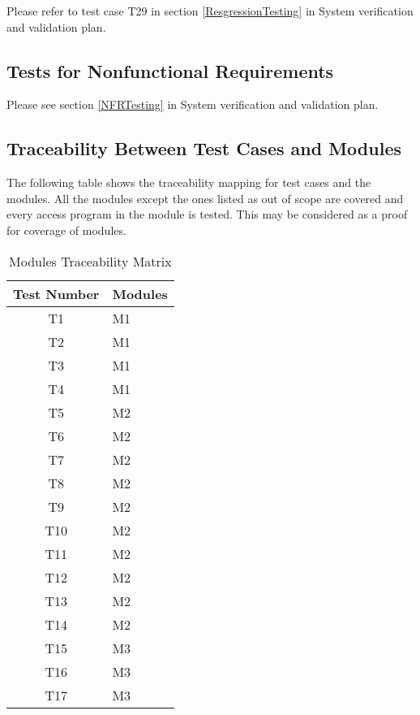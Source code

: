 \documentclass[12pt, titlepage]{article}
\begin{document}
\begin{enumerate}
Please refer to test case T29 in section \ref{ResgressionTesting} in System 
verification and validation plan.





\subsection{Tests for Nonfunctional Requirements}

Please see section \ref{NFRTesting} in System verification and validation plan.

\subsection{Traceability Between Test Cases and Modules}


The following table shows the traceability mapping for test cases and the 
modules. All the modules except the ones listed as out of scope are covered and 
every access program in the module is tested. This may be considered as a proof 
for coverage of modules.

\begin{table} [H]
	\caption{Modules Traceability Matrix}
	\label{Table:Table_Traceability}  
	\begin{tabular}{|c|p{5cm}|}
		\hline	
		\textbf{Test Number} & \textbf{Modules} \\
		\hline 
		T1&  M1      \\ \hline
		T2&   M1      \\ \hline
		T3&   M1     \\ \hline
		T4&   M1     \\ \hline
		T5&   M2      \\ \hline
		T6&   M2     \\ \hline
		T7&   M2     \\ \hline
		T8&   M2      \\ \hline
		T9&   M2     \\ \hline
		T10&  M2      \\ \hline
		T11&   M2      \\ \hline
		T12&   M2     \\ \hline
		T13&   M2     \\ \hline
		T14&   M2      \\ \hline
		T15&   M3     \\ \hline
		T16&   M3     \\ \hline
		T17&   M3      \\ \hline
		

\end{tabular}
\end{table}
\end{enumerate}
\end{document}
